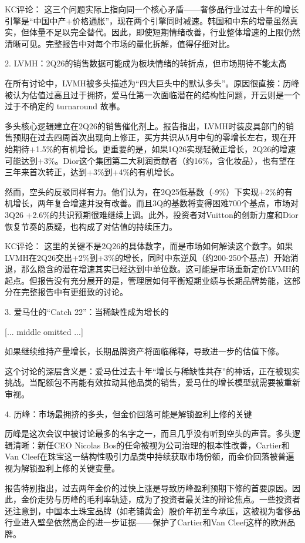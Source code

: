 \documentclass[11pt]{ctexart}
\begin{document}
KC评论： 这三个问题实际上指向同一个核心矛盾——奢侈品行业过去十年的增长引擎是“中国中产+价格通胀”，现在两个引擎同时减速。韩国和中东的增量虽然真实，但体量不足以完全替代。因此，即使短期情绪改善，行业整体增速的上限仍然清晰可见。完整报告中对每个市场的量化拆解，值得仔细对比。

2. LVMH：2Q26的销售数据可能成为板块情绪的转折点，但市场期待不能太高

在所有讨论中，LVMH被多头描述为“四大巨头中的默认多头”。原因很直接：历峰被认为估值过高且过于拥挤，爱马仕第一次面临潜在的结构性问题，开云则是一个过于不确定的 turnaround 故事。

多头核心逻辑建立在2Q26的销售催化剂上。报告指出，LVMH时装皮具部门的销售预期在过去四周首次出现向上修正，买方共识从5月中旬的零增长左右，现在开始期待+1.5\%的有机增长。更重要的是，如果1Q26实现轻微正增长，2Q26的增速可能达到+3\%。Dior这个集团第二大利润贡献者（约16\%，含化妆品），也有望在三年来首次转正，达到+3\%到+4\%的有机增长。

然而，空头的反驳同样有力。他们认为，在2Q25低基数（-9\%）下实现+2\%的有机增长，两年复合增速并没有改善。而且3Q的基数将变得困难700个基点，市场对3Q26 +2.6\%的共识预期很难继续上调。此外，投资者对Vuitton的创新力度和Dior恢复节奏的质疑，也构成了对估值的持续压力。

KC评论： 这里的关键不是2Q26的具体数字，而是市场如何解读这个数字。如果LVMH在2Q26交出+2\%到+3\%的增长，同时中东逆风（约200-250个基点）开始消退，那么隐含的潜在增速其实已经达到中单位数。这可能是市场重新定价LVMH的起点。但报告没有充分展开的是，管理层如何平衡短期业绩与长期品牌势能，这部分在完整报告中有更细致的讨论。

3. 爱马仕的“Catch 22”：当稀缺性成为增长的

[... middle omitted ...]

如果继续维持产量增长，长期品牌资产将面临稀释，导致进一步的估值下修。

这个讨论的深层含义是：爱马仕过去十年“增长与稀缺性共存”的神话，正在被现实挑战。当配额包不再能有效拉动其他品类的销售，爱马仕的增长模型就需要被重新审视。

4. 历峰：市场最拥挤的多头，但金价回落可能是解锁盈利上修的关键

历峰是这次会议中被讨论最多的名字之一，而且几乎没有听到空头的声音。多头逻辑清晰：新任CEO Nicolas Bos的任命被视为公司治理的根本性改善，Cartier和Van Cleef在珠宝这一结构性吸引力品类中持续获取市场份额，而金价回落被普遍视为解锁盈利上修的关键变量。

报告特别指出，过去两年金价的过快上涨是导致历峰盈利预期下修的首要原因。因此，金价走势与历峰的毛利率轨迹，成为了投资者最关注的辩论焦点。一些投资者还注意到，中国本土珠宝品牌（如老铺黄金）股价年初至今承压，这被视为奢侈品行业进入壁垒依然高企的进一步证据——保护了Cartier和Van Cleef这样的欧洲品牌。
\end{document}
